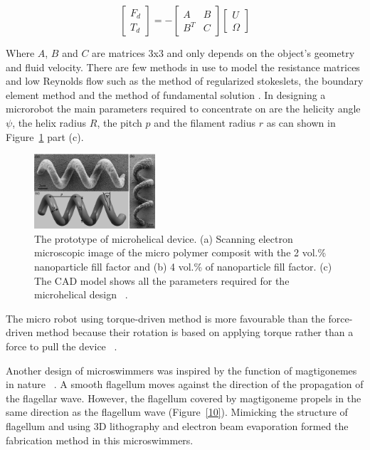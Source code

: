 \documentclass[a4paper,11pt]{article}
\begin{document}
\begin{sloppypar}
\[
\begin{bmatrix} F_d \\ 
T_d \end{bmatrix}  =- \begin{bmatrix} A & B \\ 
B^T & C \end{bmatrix}  \begin{bmatrix} U
 \\ \Omega
\end{bmatrix}
\]




Where $A$, $B$ and $C$ are matrices 3x3 and only depends on the object\rq{}s geometry and fluid velocity. 
There are few methods in use to model the resistance matrices and low Reynolds flow such as the 
method of regularized stokeslets, the boundary element method and the method of fundamental solution
. In designing a microrobot the main parameters required to concentrate on are the helicity angle $\psi$, 
the helix radius $R$, the pitch $p$ and the filament radius $r$ as can shown in Figure~\ref{ref8} part (c). 

\begin{figure}
  \centering
    \includegraphics[width=0.4\textwidth]{8}
  \caption{ The prototype of microhelical device. (a) Scanning electron microscopic image of the micro polymer composit
with the 2 vol.\% nanoparticle fill factor and (b) 4 vol.\% of nanoparticle fill factor. (c) The CAD model
shows all the parameters required for the microhelical design ~\citep{peyer2013bacteria}.}
  \label{ref8}
\end{figure}


The micro robot using torque-driven method is more favourable than the force-driven method 
because their rotation is based on applying torque rather than a force to pull the device ~\citep{peyer2013bacteria}. 



Another design of microswimmers was inspired by the function of magtigonemes in nature ~\citep{tottori2013artificial}.
 A smooth flagellum moves against the direction of the propagation of the flagellar wave. However, 
the flagellum covered by magtigoneme propels in the same direction as the flagellum wave (Figure~\ref{10}). Mimicking 
the structure of flagellum and using 3D lithography and electron beam evaporation formed the fabrication 
method in this microswimmers.


\end{sloppypar}
\end{document}
